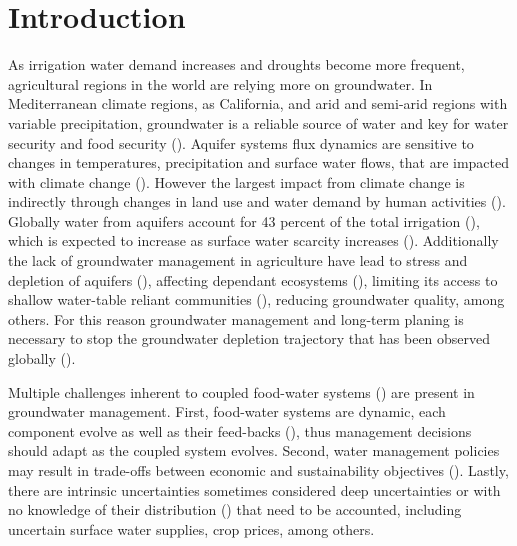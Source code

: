 \documentclass[11pt,a4paper]{article}
\begin{document}
\section{Introduction}

As irrigation water demand increases and droughts become more frequent, agricultural regions in the world are relying more on groundwater. In Mediterranean climate regions, as California, and arid and semi-arid regions with variable precipitation, groundwater is a reliable source of water and key for water security and food security (\cite{priyan_issues_2021,malmgren_groundwater_2022}). Aquifer systems flux dynamics are sensitive to changes in temperatures, precipitation and surface water flows, that are impacted with climate change (\cite{wu_divergent_2020,cuthbert_global_2019}). However the largest impact from climate change is indirectly through changes in land use and water demand by human activities (\cite{taylor_ground_2013}). Globally water from aquifers account for 43 percent of the total irrigation (\cite{siebert_groundwater_2010}), which is expected to increase as surface water scarcity increases (\cite{wada_nonsustainable_2012}). Additionally the lack of groundwater management in agriculture have lead to stress and depletion of aquifers (\cite{dalin_groundwater_2017, wada_global_2010}), affecting dependant ecosystems (\cite{bierkens_non-renewable_2019}), limiting its access to shallow water-table reliant communities (\cite{perrone_dry_2017,pauloo_domestic_2020}), reducing groundwater quality, among others. For this reason groundwater management and long-term planing is necessary to stop the groundwater depletion trajectory that has been observed globally (\cite{gorelick_global_2015}).

Multiple challenges inherent to coupled food-water systems (\cite{polhill_modelling_2016}) are present in groundwater management. First, food-water systems are dynamic, each component evolve as well as their feed-backs (\cite{filatova_regime_2016}), thus management decisions should adapt as the coupled system evolves. Second, water management policies may result in trade-offs between economic and sustainability objectives (\cite{mcdermid_minimizing_2021,torhan_tradeoffs_2022,young_hydrologic-economic_2021,stone_economic_2022}). Lastly, there are intrinsic uncertainties sometimes considered deep uncertainties or with no knowledge of their distribution (\cite{stirling_keep_2010}) that need to be accounted, including uncertain surface water supplies, crop prices, among others.  
\end{document}
